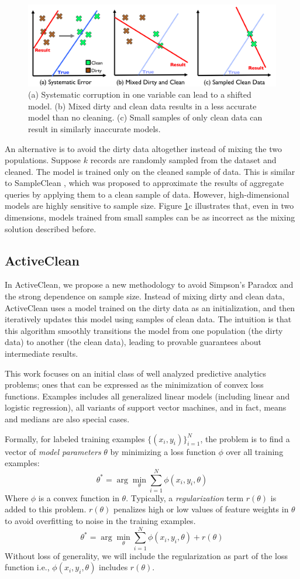 \begin{figure}[ht!]
\centering
 \includegraphics[width=0.6\columnwidth]{figs/update-arch.png}
 \caption{(a) Systematic corruption in one variable can lead to a shifted model. 
 (b) Mixed dirty and clean data results in a less accurate model than no cleaning.
(c) Small samples of only clean data can result in similarly inaccurate models. \label{update-arch1}}
\end{figure}

An alternative is to avoid the dirty data altogether instead of mixing the two populations.
Suppose $k$ records are randomly sampled from the dataset and cleaned.
The model is trained only on the cleaned sample of data.
This is similar to SampleClean \cite{wang1999sample}, which was proposed to approximate the results of aggregate queries by applying them to a clean sample of data.
However, high-dimensional models are highly sensitive to sample size.
Figure \ref{update-arch1}c illustrates that, even in two dimensions, models trained from small samples can be as incorrect as the mixing solution described before.

\subsection{ActiveClean}
In ActiveClean, we propose a new methodology to avoid Simpson's Paradox and the strong dependence on sample size.
Instead of mixing dirty and clean data, ActiveClean uses a model trained on the dirty data as an initialization, and then iteratively updates this model using samples of clean data.
The intuition is that this algorithm smoothly transitions the model from one population (the dirty data) to another (the clean data), leading to provable guarantees about intermediate results.

This work focuses on an initial class of well analyzed predictive analytics problems; ones that can be expressed as the minimization of convex loss functions.
Examples includes all generalized linear models (including linear and logistic regression), all variants of support vector machines, and in fact, means and medians are also special cases. 

Formally, for labeled training examples $\{(x_{i},y_{i})\}_{i=1}^{N}$, the problem is to find a vector of \emph{model parameters} $\theta$ by minimizing a loss function $\phi$ over all training examples:
\[
 \theta^{*}=\arg\min_{\theta}\sum_{i=1}^{N}\phi(x_{i},y_{i},\theta)
\]
Where $\phi$ is a convex function in $\theta$.
Typically, a \emph{regularization} term $r(\theta)$ is added to this problem.
$r(\theta)$ penalizes high or low values of feature weights in $\theta$ to avoid overfitting to noise in the training examples.
\[
 \theta^{*}=\arg\min_{\theta}\sum_{i=1}^{N}\phi(x_{i},y_{i},\theta) + r(\theta)
\]
Without loss of generality, we will include the regularization as part of the loss function i.e., $\phi(x_{i},y_{i},\theta)$ includes $r(\theta)$.

